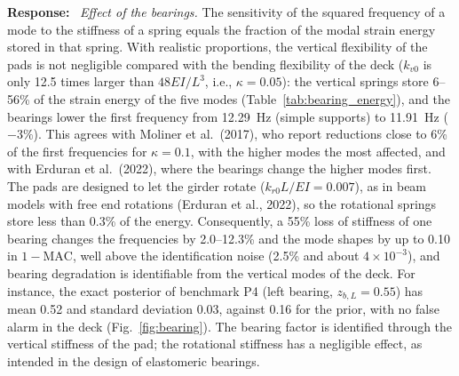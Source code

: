 \documentclass[11pt]{article}
\newenvironment{response}{\par\smallskip\noindent\color{resp}\textbf{Response:}\ }{\par}
\begin{document}
\begin{response}
\textit{Effect of the bearings.} The sensitivity of the squared frequency of a mode to the stiffness of a spring equals
the fraction of the modal strain energy stored in that spring. With realistic proportions, the vertical flexibility of
the pads is not negligible compared with the bending flexibility of the deck ($k_{v0}$ is only 12.5 times larger than
$48EI/L^3$, i.e., $\kappa=0.05$): the vertical springs store 6--56\% of the strain energy of the five modes
(Table~\ref{tab:bearing_energy}), and the bearings lower the first frequency from 12.29~Hz (simple supports) to
11.91~Hz ($-3\%$). This agrees with Moliner et al.\ (2017), who report reductions close to 6\% of the first frequencies
for $\kappa=0.1$, with the higher modes the most affected, and with Erduran et al.\ (2022), where the bearings change
the higher modes first. The pads are designed to let the girder rotate ($k_{r0}L/EI=0.007$), as in beam models with free
end rotations (Erduran et al., 2022), so the rotational springs store less than 0.3\% of the energy. Consequently, a 55\%
loss of stiffness of one bearing changes the frequencies by 2.0--12.3\% and the mode shapes by up to 0.10 in
$1-\mathrm{MAC}$, well above the identification noise (2.5\% and about $4\times10^{-3}$), and bearing degradation is
identifiable from the vertical modes of the deck. For instance, the exact posterior of benchmark P4 (left bearing,
$z_{b,L}=0.55$) has mean 0.52 and standard deviation 0.03, against 0.16 for the prior, with no false alarm in the deck
(Fig.~\ref{fig:bearing}). The bearing factor is identified through the vertical stiffness of the pad; the rotational
stiffness has a negligible effect, as intended in the design of elastomeric bearings.


\end{response}
\end{document}
